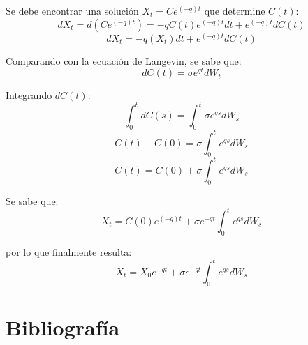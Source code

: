 \documentclass[11pt,fleqn]{book} %
\numberwithin{equation}{section} %
\numberwithin{figure}{section} %
\numberwithin{table}{section} %
\begin{document}
Se debe encontrar una solución $  X_{t} = Ce^{(-q)t} $ que determine $C(t)$:
$$ dX_{t} = d(Ce^{(-q)t}) = -qC(t)e^{(-q)t} dt + e^{(-q)t} dC(t) $$
$$ dX_{t} = -q(X_{t}) dt + e^{(-q)t} dC(t) $$

Comparando con la ecuación de Langevin, se sabe que:
$$ dC(t) = \sigma e^{qt}dW_{t} $$

Integrando $dC(t)$:
$$ \int_{0}^{t} dC(s) =  \int_{0}^{t} \sigma e^{qs}dW_{s} $$ 
$$ C(t) - C(0) =  \sigma \int_{0}^{t} e^{qs}dW_{s} $$
$$ C(t) = C(0) + \sigma \int_{0}^{t} e^{qs}dW_{s} $$

Se sabe que:
$$ X_{t} = C(0)e^{(-q)t} + \sigma e^{-qt} \int_{0}^{t} e^{qs}dW_{s}  $$

por lo que finalmente resulta:
$$ X_{t} = X_{0}e^{-qt}+\sigma e^{-qt} \int_{0}^{t}e^{qs}dW_{s}  $$

\chapter{Bibliografía}


\printbibliography[heading=bibempty,type=book]
\end{document}
